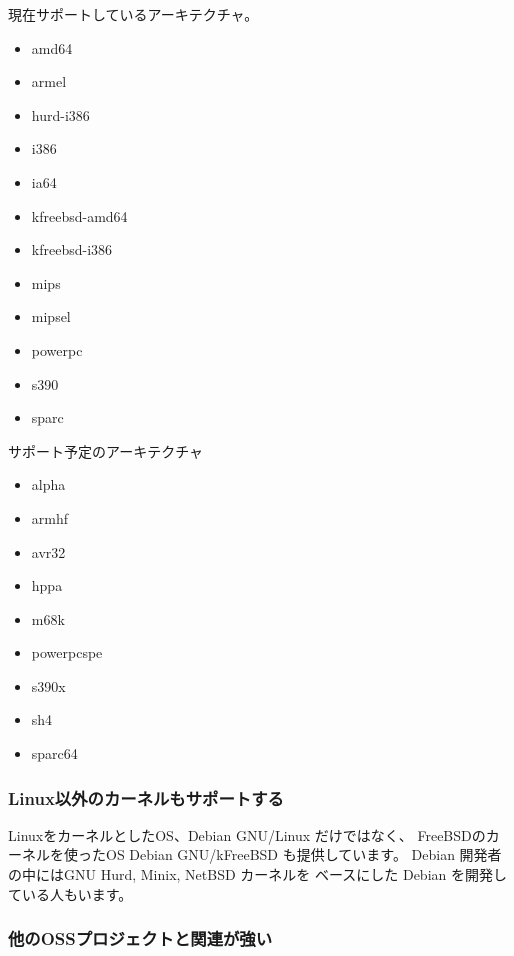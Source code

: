 \documentclass[mingoth,a4paper]{jsarticle}
\begin{document}
\begin{minipage}[t]{0.5\hsize}

現在サポートしているアーキテクチャ。
\begin{itemize}
  \item amd64
  \item armel
  \item hurd-i386
  \item i386
  \item ia64
  \item kfreebsd-amd64
  \item kfreebsd-i386
  \item mips
  \item mipsel
  \item powerpc
  \item s390
  \item sparc
\end{itemize}

\end{minipage}
\begin{minipage}[t]{0.5\hsize}

サポート予定のアーキテクチャ
\begin{itemize}
  \item alpha
  \item armhf
  \item avr32
  \item hppa
  \item m68k
  \item powerpcspe
  \item s390x
  \item sh4
  \item sparc64
\end{itemize}

\end{minipage}

\subsubsection{Linux以外のカーネルもサポートする}

LinuxをカーネルとしたOS、Debian GNU/Linux だけではなく、
FreeBSDのカーネルを使ったOS Debian GNU/kFreeBSD 
も提供しています。
Debian 開発者の中にはGNU Hurd, Minix, NetBSD カーネルを
ベースにした Debian を開発している人もいます。

\subsubsection{他のOSSプロジェクトと関連が強い}
\end{document}
